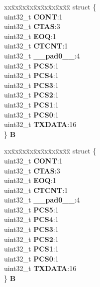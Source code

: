 \begin{DoxyCompactItemize}
\begin{tabbing}
\end{tabbing}\item 
\mbox{\label{unionDSPI__tag_1_1DSPI__PUSHR__tag_a040d6baeeb139c276fd53ad5c73a14eb}} 
\begin{tabbing}
xx\=xx\=xx\=xx\=xx\=xx\=xx\=xx\=xx\=\kill
struct \{\\
\>uint32\_t {\bfseries CONT}:1\\
\>uint32\_t {\bfseries CTAS}:3\\
\>uint32\_t {\bfseries EOQ}:1\\
\>uint32\_t {\bfseries CTCNT}:1\\
\>uint32\_t {\bfseries \_\_pad0\_\_}:4\\
\>uint32\_t {\bfseries PCS5}:1\\
\>uint32\_t {\bfseries PCS4}:1\\
\>uint32\_t {\bfseries PCS3}:1\\
\>uint32\_t {\bfseries PCS2}:1\\
\>uint32\_t {\bfseries PCS1}:1\\
\>uint32\_t {\bfseries PCS0}:1\\
\>uint32\_t {\bfseries TXDATA}:16\\
\} {\bfseries B}\\

\end{tabbing}\item 
\mbox{\label{unionDSPI__tag_1_1DSPI__PUSHR__tag_aebed53cec662ffb2937732f311aabad3}} 
\begin{tabbing}
xx\=xx\=xx\=xx\=xx\=xx\=xx\=xx\=xx\=\kill
struct \{\\
\>uint32\_t {\bfseries CONT}:1\\
\>uint32\_t {\bfseries CTAS}:3\\
\>uint32\_t {\bfseries EOQ}:1\\
\>uint32\_t {\bfseries CTCNT}:1\\
\>uint32\_t {\bfseries \_\_pad0\_\_}:4\\
\>uint32\_t {\bfseries PCS5}:1\\
\>uint32\_t {\bfseries PCS4}:1\\
\>uint32\_t {\bfseries PCS3}:1\\
\>uint32\_t {\bfseries PCS2}:1\\
\>uint32\_t {\bfseries PCS1}:1\\
\>uint32\_t {\bfseries PCS0}:1\\
\>uint32\_t {\bfseries TXDATA}:16\\
\} {\bfseries B}\\


\end{tabbing}
\end{DoxyCompactItemize}
